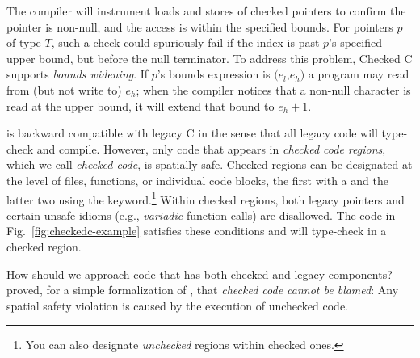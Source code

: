 The \checkedc compiler will instrument loads and stores of checked
pointers to confirm the pointer is non-null, and the access is within
the specified bounds. For pointers $p$ of type
$T$\code{>}, such a check could spuriously fail if
the index is past $p$'s specified upper bound, but before the null
terminator. To address this problem, Checked C supports \emph{bounds
  widening}.
If $p$'s bounds expression is $(e_l$,$e_h)$ a program may read from (but not
write to) $e_h$; when the compiler notices that a non-null character
is read at the upper bound, it will extend that bound to $e_h+1$.

%
\checkedc is backward compatible with legacy C in the sense that all legacy code
will type-check and compile. However, only code that appears in \emph{checked
  code regions}, which we call \emph{checked code}, is spatially safe. Checked
regions can be designated at the level of files, functions, or individual code
blocks, the first with a  and the latter two using the
 keyword.\footnote{You can also designate \emph{unchecked} regions
  within checked ones.}  Within checked regions, both legacy pointers and
certain unsafe idioms (e.g., \emph{variadic} function calls) are disallowed. The
code in Fig.~\ref{fig:checkedc-example} satisfies these conditions and will
type-check in a checked region.

How should we approach code that has both checked and legacy components?
\citet{li22checkedc} proved, for a simple formalization of \checkedc, that
\emph{checked code cannot be blamed}: Any spatial safety violation is caused by
the execution of unchecked code.
%
% 
% 

